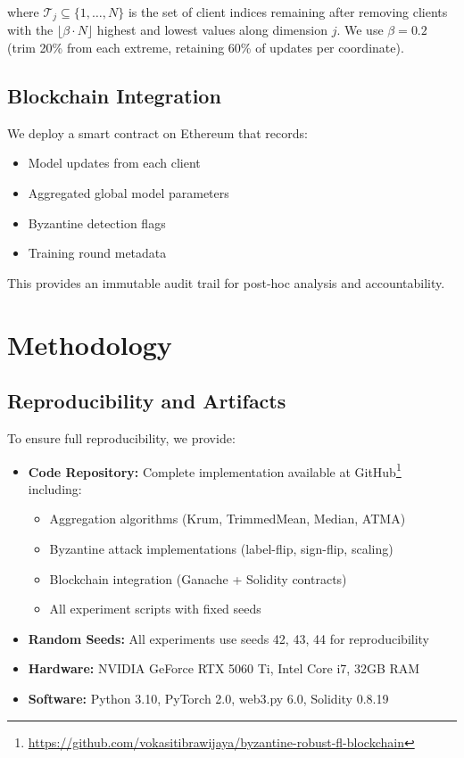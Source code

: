 \documentclass[12pt,a4paper,onecolumn]{article}
\begin{document}
where $\mathcal{T}_j \subseteq \{1,\ldots,N\}$ is the set of client indices remaining after removing clients with the $\lfloor\beta \cdot N\rfloor$ highest and lowest values along dimension $j$. We use $\beta = 0.2$ (trim 20\% from each extreme, retaining 60\% of updates per coordinate).

\subsection{Blockchain Integration}

We deploy a smart contract on Ethereum that records:
\begin{itemize}
    \item Model updates from each client
    \item Aggregated global model parameters
    \item Byzantine detection flags
    \item Training round metadata
\end{itemize}

This provides an immutable audit trail for post-hoc analysis and accountability.

\section{Methodology}
\label{sec:methodology}

\subsection{Reproducibility and Artifacts}

To ensure full reproducibility, we provide:
\begin{itemize}
    \item \textbf{Code Repository:} Complete implementation available at GitHub\footnote{\url{https://github.com/vokasitibrawijaya/byzantine-robust-fl-blockchain}} including:
    \begin{itemize}
        \item Aggregation algorithms (Krum, TrimmedMean, Median, ATMA)
        \item Byzantine attack implementations (label-flip, sign-flip, scaling)
        \item Blockchain integration (Ganache + Solidity contracts)
        \item All experiment scripts with fixed seeds
    \end{itemize}
    \item \textbf{Random Seeds:} All experiments use seeds 42, 43, 44 for reproducibility
    \item \textbf{Hardware:} NVIDIA GeForce RTX 5060 Ti, Intel Core i7, 32GB RAM
    \item \textbf{Software:} Python 3.10, PyTorch 2.0, web3.py 6.0, Solidity 0.8.19
\end{itemize}
\end{document}
